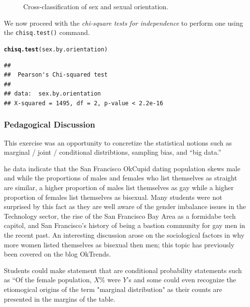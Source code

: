 \documentclass{article}\usepackage[]{graphicx}\usepackage[]{color}
\makeatletter
\newcommand{\hlstd}[1]{\textcolor[rgb]{0.345,0.345,0.345}{#1}}%
\newcommand{\hlkwd}[1]{\textcolor[rgb]{0.737,0.353,0.396}{\textbf{#1}}}%
\newenvironment{kframe}{%
 \def\at@end@of@kframe{}%
 \ifinner\ifhmode%
  \def\at@end@of@kframe{\end{minipage}}%
  \begin{minipage}{\columnwidth}%
 \fi\fi%
 \def\FrameCommand##1{\hskip\@totalleftmargin \hskip-\fboxsep
 \colorbox{shadecolor}{##1}\hskip-\fboxsep
     \hskip-\linewidth \hskip-\@totalleftmargin \hskip\columnwidth}%
 \MakeFramed {\advance\hsize-\width
   \@totalleftmargin\z@ \linewidth\hsize
   \@setminipage}}%
 {\par\unskip\endMakeFramed%
 \at@end@of@kframe}
\newenvironment{knitrout}{}{} %
\makeatother
\begin{document}
\begin{knitrout}
\begin{figure}
{}

\caption[Cross-classification of sex and sexual orientation]{Cross-classification of sex and sexual orientation.}\label{fig:sex_by_orientation}
\end{figure}


\end{knitrout}

We now proceed with the \textit{chi-square tests for independence} to perform one using the \verb#chisq.test()# command.
\begin{knitrout}
\color{fgcolor}\begin{kframe}
\begin{alltt}
\hlkwd{chisq.test}\hlstd{(sex.by.orientation)}
\end{alltt}
\begin{verbatim}
## 
## 	Pearson's Chi-squared test
## 
## data:  sex.by.orientation
## X-squared = 1495, df = 2, p-value < 2.2e-16
\end{verbatim}
\end{kframe}
\end{knitrout}



\subsubsection{Pedagogical Discussion}
This exercise was an opportunity to concretize the statistical notions such as marginal / joint / conditional distribtions, sampling bias, and ``big data.''

he data indicate that the San Francisco OkCupid dating population skews male and while the proportions of males and females who list themselves as straight are similar, a higher proportion of males list themselves as gay while a higher proportion of females list themselves as bisexual.  Many students were not surprised by this fact as they are well aware of the gender imbalance issues in the Technology sector, the rise of the San Francisco Bay Area as a formidabe tech capitol, and San Francisco's history of being a bastion community for gay men in the recent past.  An interesting discussion arose on the sociological factors in why more women listed themselves as bisexual then men; this topic has previously been covered on the blog OkTrends\cite{OkTrendsLies}.

Students could make statement that are conditional probability statements such as ``Of the female population, $X$\% were $Y$'s and some could even recognize the etiomogical origins of the term "marginal distribution" as their counts are presented in the margins of the table.
\end{document}
